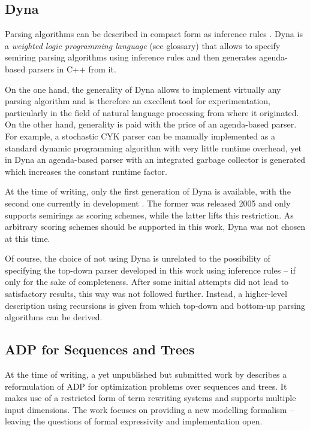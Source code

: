 \documentclass[
    a4paper,
    12pt,
    twoside,
    BCOR=12mm,
    parskip=half,
    chapterprefix,
    numbers=noenddot,
    bibliography=totoc
]{scrbook}
\begin{document}
\subsection*{Dyna}

Parsing algorithms can be described in compact form as inference rules \citep{pereira_parsing_1983}. Dyna \citep{eisner_compiling_2005} is a \emph{weighted logic programming language} (see glossary) that allows to specify semiring parsing algorithms using inference rules and then generates agenda-based parsers in C++ from it.

On the one hand, the generality of Dyna allows to implement virtually any parsing algorithm and is therefore an excellent tool for experimentation, particularly in the field of natural language processing from where it originated. On the other hand, generality is paid with the price of an agenda-based parser. For example, a stochastic CYK parser can be manually implemented as a standard dynamic programming algorithm with very little runtime overhead, yet in Dyna an agenda-based parser with an integrated garbage collector is generated which increases the constant runtime factor.

At the time of writing, only the first generation of Dyna is available, with the second one currently in development \citep{eisner_dyna:_2011,filardo_flexible_2012}. The former was released 2005 and only supports semirings as scoring schemes, while the latter lifts this restriction. As arbitrary scoring schemes should be supported in this work, Dyna was not chosen at this time.

Of course, the choice of not using Dyna is unrelated to the possibility of specifying the top-down parser developed in this work using inference rules -- if only for the sake of completeness. After some initial attempts did not lead to satisfactory results, this way was not followed further. Instead, a higher-level description using recursions is given from which top-down and bottom-up parsing algorithms can be derived.

\subsection*{ADP for Sequences and Trees}

At the time of writing, a yet unpublished but submitted work by \citet{giegerich_modeling_2013} describes a reformulation of \gls{ADP} for optimization problems over sequences and trees. It makes use of a restricted form of term rewriting systems and supports multiple input dimensions. The work focuses on providing a new modelling formalism -- leaving the questions of formal expressivity and implementation open.
\end{document}
